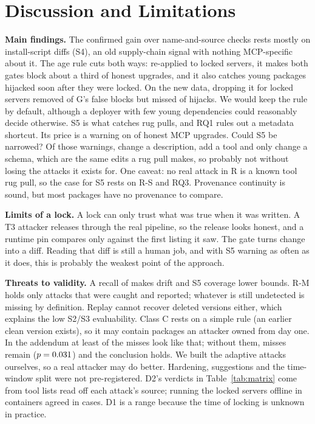\documentclass[conference]{IEEEtran}
\newcommand{\G}{\textsf{G}}
\begin{document}
\section{Discussion and Limitations}
\textbf{Main findings.} The confirmed gain over name-and-source checks rests mostly on install-script
diffs (S4), an old supply-chain signal with nothing MCP-specific about it. The age rule cuts both ways: re-applied to locked
servers, it makes both gates block about a third of honest upgrades, and it also catches young packages hijacked soon
after they were locked. On the new
data, dropping it for locked servers removed \AoneFbRemoved{} of \G's false blocks but missed \AoneLost{} of \AoneRC{}
hijacks. We would keep the rule by default, although a deployer with few young dependencies could reasonably decide
otherwise. S5 is what catches rug pulls, and RQ1 rules out a metadata shortcut. Its price is a warning on \WarnGMcpP{}
of honest MCP upgrades. Could S5 be narrowed? Of those \SfiveWarnN{} warnings, \SfDescP{} change a description,
\SfAddsP{} add a tool and \SfSchemaP{} only change a schema, which are the same edits a rug pull makes, so probably not
without losing the attacks it exists for. One caveat: no real attack in R is a known tool rug pull, so the case for S5
rests on R-S and RQ3. Provenance continuity is sound, but most packages have no provenance to compare.

\textbf{Limits of a lock.} A lock can only trust what was true when it was written. A T3 attacker releases through
the real pipeline, so the release looks honest, and a runtime pin compares only against the first listing it saw. The
gate turns change into a diff. Reading that diff is still a human job, and with S5 warning as often as it does, this is
probably the weakest point of the approach.

\textbf{Threats to validity.} A recall of \ValRec{} makes drift and S5 coverage lower bounds. R-M holds only
attacks that were caught and reported; whatever is still undetected is missing by definition. Replay cannot recover
deleted versions either, which explains the low S2/S3 evaluability. Class C rests on a simple rule (an earlier clean
version exists), so it may contain packages an attacker owned from day one. In the addendum at least \AoneOwned{} of
the \AoneLost{} misses look like that; without them, \AoneLostAdj{} misses remain ($p = 0.031$) and the
conclusion holds. We built the adaptive attacks ourselves, so a real attacker
may do better. Hardening, suggestions and the time-window split
were not pre-registered. D2's verdicts in Table~\ref{tab:matrix} come from tool lists read off each attack's source;
running the \RtCases{} locked servers offline in containers agreed in \RtAgree{} cases. D1 is a range because the time
of locking is unknown in practice.
\end{document}
